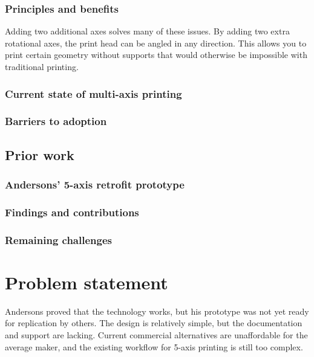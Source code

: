 \subsubsection{Principles and benefits}
\label{subsubsec:intro-multi-axis-principles}
Adding two additional axes solves many of these issues. By adding two extra rotational axes, the print head can be angled in any direction. This allows you to print certain geometry without supports that would otherwise be impossible with traditional printing.

\subsubsection{Current state of multi-axis printing}
\label{subsubsec:intro-multi-axis-state}

\subsubsection{Barriers to adoption}
\label{subsubsec:intro-multi-axis-barriers}

\subsection{Prior work}
\label{subsec:intro-prior-work}

\subsubsection{Andersons' 5-axis retrofit prototype}
\label{subsubsec:intro-andersons}

\subsubsection{Findings and contributions}
\label{subsubsec:intro-andersons-findings}

\subsubsection{Remaining challenges}
\label{subsubsec:intro-andersons-challenges}

\section{Problem statement}
\label{sec:intro-problem}
Andersons proved that the technology works, but his prototype was not yet ready for replication by others. The design is relatively simple, but the documentation and support are lacking. Current commercial alternatives are unaffordable for the average maker, and the existing workflow for 5-axis printing is still too complex.


